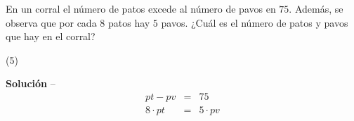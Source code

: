 \item{En un corral el número de patos excede al número de pavos en $75$. Además, se observa que por cada $8$ patos hay $5$ pavos. ¿Cuál es el número de patos y pavos que hay en el corral? 
\begin{tasks}(5)
\end{tasks}
\noindent \textbf{Solución} -- 
\begin{eqnarray*}
pt - pv &=& 75 \\
8 \cdot pt &=& 5 \cdot pv \\ 
\end{eqnarray*}
}